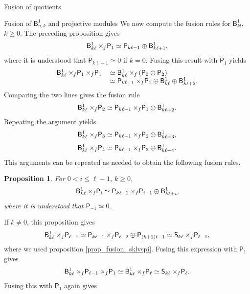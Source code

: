 \documentclass[reqno]{amsart}
\newtheorem{Prop}[Thm]{Proposition}
\newcommand{\ds}[1]{\mathsf S_{#1}}
\newcommand{\dP}[1]{\mathsf P_{#1}}
\newcommand{\xf}{\times\hspace{-0.27em}_f}
\newcommand{\B}[2]{\mathsf{B}^{#1}_{#2}}
\newcommand{\lc}{\ell}
\begin{document}
\begin{section}{Fusion of quotients}
\begin{subsection}{Fusion of $\B{1}{n,k}$ and projective modules}
We now compute the fusion rules for $\B{1}{k l}$, $k\geq 0$. The preceding proposition gives
\begin{equation*}
\B{1}{k \lc} \xf \dP{1} \simeq \dP{k \lc -1} \oplus \B{1}{k \lc +1},
\end{equation*}
where it is understood that $\dP{k \lc -1} \simeq 0$ if $k=0$. Fusing this result with $\dP{1}$ yields
\begin{equation*}
\begin{tabular}{r l}
$\B{1}{k\lc} \xf \dP{1}\xf\dP{1} $&$\simeq \B{1}{k\lc} \xf \left(\dP{0} \oplus \dP{2} \right)$\\
&$\simeq \dP{k \lc -1} \xf \dP{1} \oplus \B{1}{k \lc} \oplus \B{1}{k \lc +2}$.
\end{tabular}
\end{equation*} 
Comparing the two lines gives the fusion rule
\begin{equation*}
\B{1}{k\lc} \xf \dP{2} \simeq \dP{k \lc -1}\xf \dP{1} \oplus \B{1}{k \lc +2}.
\end{equation*}
Repeating the argument yields
\begin{equation*}
\B{1}{k\lc} \xf \dP{3} \simeq \dP{k \lc -1} \xf \dP{2} \oplus \B{1}{k \lc +3},
\end{equation*}
\begin{equation*}
\B{1}{k\lc} \xf \dP{4} \simeq \dP{k \lc -1} \xf \dP{3} \oplus \B{1}{k\lc +4}.
\end{equation*}
This arguments can be repeated as needed to obtain the following fusion rules.
\begin{Prop}\label{prop:fusion.B1vsSmallP}
For $0< i \leq \lc-1$, $k\geq 0$,
\begin{equation}
\B{1}{k\lc} \xf \dP{i} \simeq \dP{k \lc -1} \xf \dP{i-1} \oplus \B{1}{k\lc +i},
\end{equation}
where it is understood that $\dP{-1} \simeq 0$.
\end{Prop}
If $k\neq 0$, this proposition gives
\begin{equation*}
\B{1}{k\lc} \xf \dP{\lc -1} \simeq \dP{k\lc -1} \xf \dP{\lc -2} \oplus \dP{(k+1)\lc-1} \simeq \ds{k \lc} \xf \dP{\lc -1},
\end{equation*}
where we used proposition \ref{prop_fusion_sklvspi}. Fusing this expression with $\dP{1}$ gives
\begin{equation*}
\B{1}{k \lc} \xf \dP{\lc -1} \xf \dP{1} \simeq \B{1}{k \lc} \xf \dP{\lc} \simeq \ds{k \lc} \xf \dP{\lc}.
\end{equation*}
Fusing this with $\dP{1}$ again gives
\begin{equation*}

\end{equation*}
\end{subsection}
\end{section}
\end{document}

